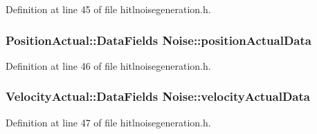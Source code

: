 Definition at line 45 of file hitlnoisegeneration.\-h.

\hypertarget{group__hitlplugin_ga54f9e7005f571fdacf23a67005004b0a}{
\subsubsection[{position\-Actual\-Data}]{\setlength{\rightskip}{0pt plus 5cm}Position\-Actual\-::\-Data\-Fields Noise\-::position\-Actual\-Data}}\label{group__hitlplugin_ga54f9e7005f571fdacf23a67005004b0a}


Definition at line 46 of file hitlnoisegeneration.\-h.

\hypertarget{group__hitlplugin_ga45f843b87142396306b05148bf19b766}{
\subsubsection[{velocity\-Actual\-Data}]{\setlength{\rightskip}{0pt plus 5cm}Velocity\-Actual\-::\-Data\-Fields Noise\-::velocity\-Actual\-Data}}\label{group__hitlplugin_ga45f843b87142396306b05148bf19b766}


Definition at line 47 of file hitlnoisegeneration.\-h.

